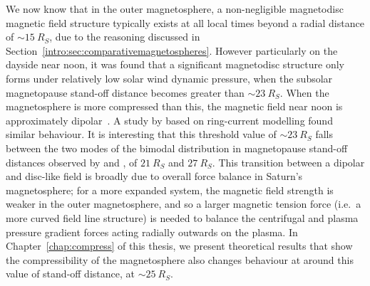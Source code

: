We now know that in the outer magnetosphere, a non-negligible magnetodisc magnetic field structure typically exists at all local times beyond a radial distance of ${\sim}\SI{15}{R_S}$, due to the reasoning discussed in Section~\ref{intro:sec:comparativemagnetospheres}. However particularly on the dayside near noon, it was found that a significant magnetodisc structure only forms under relatively low solar wind dynamic pressure, when the subsolar magnetopause stand-off distance becomes greater than ${\sim}\SI{23}{R_S}$. When the magnetosphere is more compressed than this, the magnetic field near noon is approximately dipolar~\citep{arridge2008}. A study by \citet{bunce2008} based on ring-current modelling found similar behaviour. It is interesting that this threshold value of ${\sim}\SI{23}{R_S}$ falls between the two modes of the bimodal distribution in magnetopause stand-off distances observed by \citet{achilleos2008} and \citet{pilkington2015}, of $\SI{21}{R_S}$ and $\SI{27}{R_S}$. This transition between a dipolar and disc-like field is broadly due to overall force balance in Saturn's magnetosphere; for a more expanded system, the magnetic field strength is weaker in the outer magnetosphere, and so a larger magnetic tension force (i.e.\ a more curved field line structure) is needed to balance the centrifugal and plasma pressure gradient forces acting radially outwards on the plasma. In Chapter~\ref{chap:compress} of this thesis, we present theoretical results that show the compressibility of the magnetosphere also changes behaviour at around this value of stand-off distance, at ${\sim}\SI{25}{R_S}$. 

